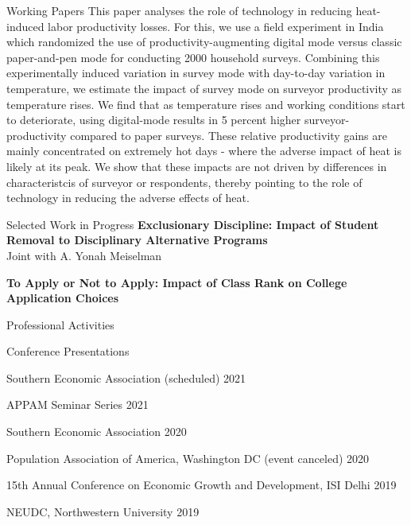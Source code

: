 \documentclass{resume} %
\begin{document}
\begin{rSection}{Working Papers}
This paper analyses the role of technology in reducing heat-induced labor productivity losses. For this, we use a field experiment in India which randomized the use of productivity-augmenting digital mode versus classic paper-and-pen mode for conducting 2000 household surveys. Combining this experimentally induced variation in survey mode with day-to-day variation in temperature, we estimate the impact of survey mode on surveyor productivity as temperature rises. We find that as temperature rises and working conditions start to deteriorate, using digital-mode results in 5 percent higher surveyor-productivity compared to paper surveys. These relative productivity gains are mainly concentrated on extremely hot days - where the adverse impact of heat is likely at its peak. We show that these impacts are not driven by differences in characteristcis of surveyor or respondents, thereby pointing to the role of technology in reducing the adverse effects of heat.\\

\end{rSection}


\begin{rSection}{Selected Work in Progress}
\vspace{.5em}
{\bf Exclusionary Discipline: Impact of Student Removal to Disciplinary Alternative Programs }\\Joint with A. Yonah Meiselman 
\vspace{.7em}

{\bf To Apply or Not to Apply: Impact of Class Rank on College Application Choices}

\end{rSection}



\begin{rSection}{Professional Activities}
\vspace{.56em}
\begin{rSubsection}{Conference Presentations}{}{}{}
\item[] Southern Economic Association (scheduled)  \hfill{2021}
\item[] APPAM Seminar Series \hfill{2021}
\item[] Southern Economic Association  \hfill{2020} 
\item[] Population Association of America, Washington DC (event canceled) \hfill{2020}
\item[] 15th Annual Conference on Economic Growth and Development, ISI Delhi \hfill{2019}
\item[] NEUDC, Northwestern University \hfill{2019}
\end{rSubsection}
\end{rSection}
\end{document}
